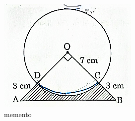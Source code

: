 \begin{enumerate}
\begin{figure}[!ht]
    \centering
    \includegraphics[width=\columnwidth]{figs/30_2_1_Q36.png}
    \caption{memento}
    \label{fig:30_2_1_Q36}
\end{figure}


\end{enumerate}
